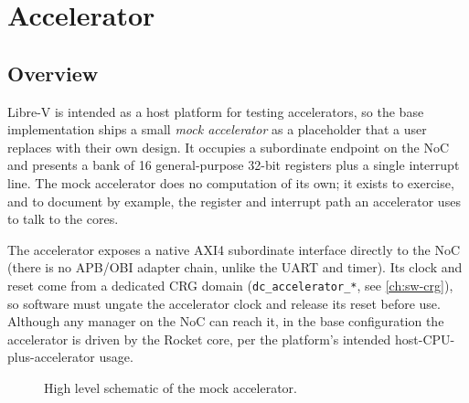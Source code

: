 \chapter{Accelerator}\label{ch:sw-accel}

\section{Overview}
Libre-V is intended as a host platform for testing accelerators, so the base implementation ships a
small \emph{mock accelerator} as a placeholder that a user replaces with their own design. It occupies a
subordinate endpoint on the NoC and presents a bank of 16 general-purpose 32-bit registers plus a single
interrupt line. The mock accelerator does no computation of its own; it exists to exercise, and to
document by example, the register and interrupt path an accelerator uses to talk to the cores.

The accelerator exposes a native AXI4 subordinate interface directly to the NoC (there is no APB/OBI
adapter chain, unlike the UART and timer). Its clock and reset come from a dedicated CRG domain
(\texttt{dc\_accelerator\_*}, see \autoref{ch:sw-crg}), so software must ungate the accelerator clock
and release its reset before use. Although any manager on the NoC can reach it, in the base
configuration the accelerator is driven by the Rocket core, per the platform's intended
host-CPU-plus-accelerator usage.

\begin{figure}[htbp]
  \centering
  \usetikzlibrary{positioning,arrows.meta,fit,backgrounds}
  \caption{High level schematic of the mock accelerator.}
  \label{fig:accel-schematic}
\end{figure}

